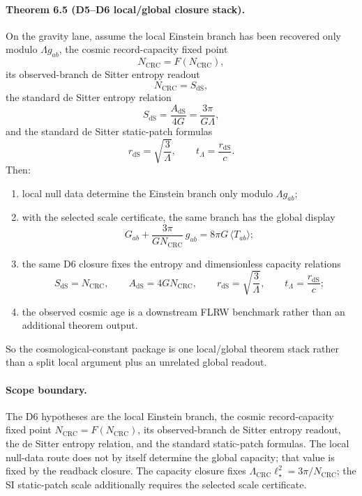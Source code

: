\paragraph{\textbf{Theorem 6.5 (D5--D6 local/global closure stack).}}
On the gravity lane, assume the local Einstein branch has been recovered only modulo
\(\Lambda g_{ab}\), the cosmic record-capacity fixed point
\[
N_{\mathrm{CRC}}=F(N_{\mathrm{CRC}}),
\]
its observed-branch de Sitter entropy readout
\[
N_{\mathrm{CRC}}=S_{\mathrm{dS}},
\]
\noindent the standard de Sitter entropy relation
\[
S_{\mathrm{dS}}=\frac{A_{\mathrm{dS}}}{4G}=\frac{3\pi}{G\Lambda},
\]
and the standard de Sitter static-patch formulas
\[
r_{\mathrm{dS}}=\sqrt{\frac{3}{\Lambda}},
\qquad
t_\Lambda=\frac{r_{\mathrm{dS}}}{c}.
\]
Then:
\begin{enumerate}[leftmargin=2em]
\item local null data determine the Einstein branch only modulo \(\Lambda g_{ab}\);
\item with the selected scale certificate, the same branch has the global display
\[
G_{ab}+\frac{3\pi}{G N_{\mathrm{CRC}}}\,g_{ab}=8\pi G\,\langle T_{ab}\rangle;
\]
\item the same D6 closure fixes the entropy and dimensionless capacity relations
\[
S_{\mathrm{dS}}=N_{\mathrm{CRC}},
\qquad
A_{\mathrm{dS}}=4G N_{\mathrm{CRC}},
\qquad
r_{\mathrm{dS}}=\sqrt{\frac{3}{\Lambda}},
\qquad
t_\Lambda=\frac{r_{\mathrm{dS}}}{c};
\]
\item the observed cosmic age is a downstream FLRW benchmark rather than an additional theorem output.
\end{enumerate}
So the cosmological-constant package is one local/global theorem stack rather than a split local
argument plus an unrelated global readout.

\paragraph{\textbf{Scope boundary.}}
The D6 hypotheses are the local Einstein branch, the cosmic record-capacity fixed point
\(N_{\mathrm{CRC}}=F(N_{\mathrm{CRC}})\), its observed-branch de Sitter entropy readout, the de
Sitter entropy relation, and the standard static-patch formulas. The local null-data route does not
by itself determine the global capacity; that value is fixed by the readback closure. The capacity
closure fixes \(\Lambda_{\mathrm{CRC}}\ell_\star^2=3\pi/N_{\mathrm{CRC}}\); the SI static-patch
scale additionally requires the selected scale certificate.

